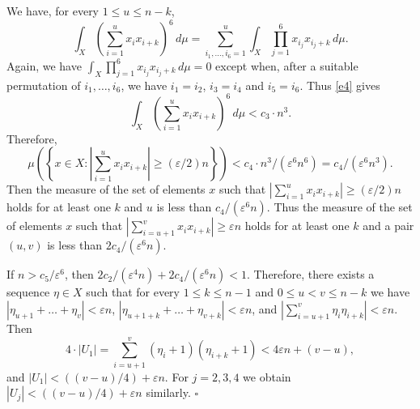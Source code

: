 \documentclass[12pt]{article}
\def\ep{\varepsilon}
\def\cd{\cdot}
\def\stb{,\ldots ,}
\begin{document}
We have, for every $1\le u\le n-k$,
\begin{equation} \label{e4}
\int_X \left( \sum_{i=1}^u x_{i} x_{i +k} \right) ^6 \, d\mu =
\sum_{i_1 \stb i_6 =1}^u \int_X \prod_{j=1}^6 x_{i_j} x_{i_j +k} \, d\mu .
\end{equation} 
Again, we have $\int_X \prod_{j=1}^6 x_{i_j} x_{i_j +k} \, d\mu =0$
except when, after a suitable permutation of $i_1 \stb i_6$, we have $i_1 =i_2$,
$i_3 =i_4$ and $i_5 =i_6$. Thus \eqref{e4} gives
$$\int_X \left( \sum_{i=1}^u x_{i} x_{i +k} \right) ^6 \, d\mu <c_3 \cd n^3 .$$
Therefore,
$$\mu \left( \left\{ x\in X\colon \left| \sum_{i=1}^{u} x_{i} x_{i +k} \right|
\ge (\ep /2) n \right \}\right) <c_4 \cd n^3 /(\ep ^6 n^6 )=c_4 /(\ep ^6 n^3 ) .$$
Then the measure of the set of elements $x$ such that
$|\sum_{i=1}^u x_{i} x_{i +k}|\ge (\ep /2) n$ holds for at least one $k$ and 
$u$ is less than $c_4 /(\ep ^6 n)$. Thus the measure of the set of elements $x$
such that $|\sum_{i=u+1}^v x_{i} x_{i +k}|\ge \ep n$ holds for at least one $k$
and a pair $(u,v)$ is less than $2c_4 /(\ep ^6 n)$. 

If $n>c_5 /\ep ^6$, then $2c_2 /(\ep ^4 n ) +2c_4 /(\ep ^6 n)<1$.
Therefore,
there exists a sequence $\eta \in X$ such that for every $1\le k\le n-1$
and $0\le u<v\le n-k$ we have $|\eta_{u+1} +\ldots +\eta_v | < \ep n$,
$|\eta_{u+1+k} +\ldots +\eta_{v+k} | <\ep n$, and
$|\sum_{i=u+1}^v \eta _i \eta _{i+k} |<\ep n$. Then
$$4\cd |U_1 |=\sum_{i=u+1}^v (\eta _i +1)(\eta _{i+k} +1 )< 4\ep n+ (v-u),$$
and $|U_1 | <((v-u)/4) +\ep n$. For $j=2,3,4$ we obtain 
$|U_j | <((v-u)/4) +\ep n$ similarly. \hfill $\square$
\end{document}
